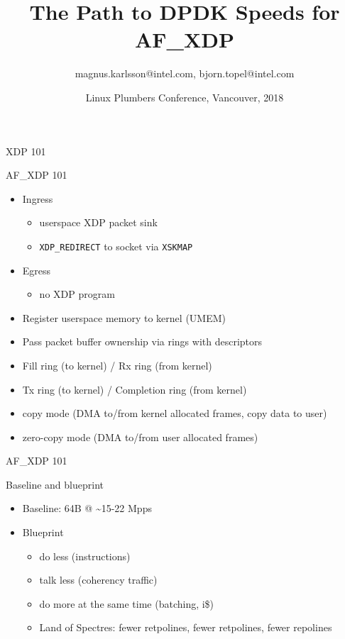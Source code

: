 \documentclass[aspectratio=169]{beamer}
\title{The Path to DPDK Speeds for AF\_XDP}
\date{Linux Plumbers Conference, Vancouver, 2018}
\author{magnus.karlsson@intel.com, bjorn.topel@intel.com}
\begin{document}
  \maketitle

  \begin{frame}{XDP 101}
    \centering\resizebox{!}{.9\textheight}{}
  \end{frame}
  \begin{frame}{AF\_XDP 101}
    \begin{itemize}
    \item Ingress
      \begin{itemize}
      \item userspace XDP packet sink
      \item {\tt XDP\_REDIRECT} to socket via {\tt XSKMAP}
      \end{itemize}
    \item Egress
      \begin{itemize}
      \item no XDP program
      \end{itemize}
    \item Register userspace memory to kernel (UMEM)
    \item Pass packet buffer ownership via rings with descriptors
    \item Fill ring (to kernel) / Rx ring (from kernel)
    \item Tx ring (to kernel) / Completion ring (from kernel)
    \item copy mode (DMA to/from kernel allocated frames, copy data to user)
    \item zero-copy mode (DMA to/from user allocated frames)
    \end{itemize}
  \end{frame}
  \begin{frame}{AF\_XDP 101}
    \centering\resizebox{\textwidth}{!}{}
  \end{frame}

  \begin{frame}{Baseline and blueprint}
      \begin{itemize}
      \item Baseline: 64B @ \textasciitilde15-22 Mpps
      \item Blueprint
      \begin{itemize}
        \item do less (instructions)
        \item talk less (coherency traffic)
        \item do more at the same time (batching, i\$)
        \item Land of Spectres: fewer retpolines, fewer retpolines,
          fewer repolines
      \end{itemize}

      \end{itemize}
  \end{frame}
\end{document}
